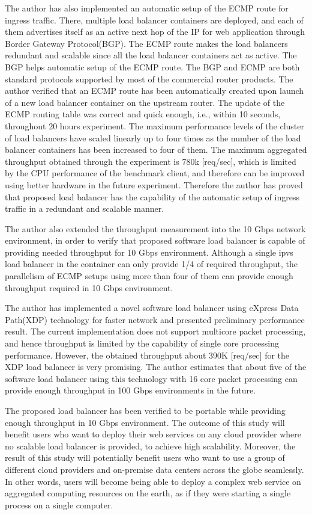 The author has also implemented an automatic setup of the ECMP route for ingress traffic.
There, multiple load balancer containers are deployed, and each of them advertises itself as an active next hop of the IP for web application through Border Gateway Protocol(BGP).
The ECMP route makes the load balancers redundant and scalable since all the load balancer containers act as active.
The BGP helps automatic setup of the ECMP route.  
The BGP and ECMP are both standard protocols supported by most of the commercial router products.
%
The author verified that an ECMP route has been automatically created upon launch of a new load balancer container on the upstream router.
The update of the ECMP routing table was correct and quick enough, i.e., within 10 seconds, throughout 20 hours experiment.
The maximum performance levels of the cluster of load balancers have scaled linearly up to four times as the number of the load balancer containers has been increased to four of them.
The maximum aggregated throughput obtained through the experiment is 780k [req/sec], which is limited by the CPU performance of the benchmark client, and therefore can be improved using better hardware in the future experiment.
Therefore the author has proved that proposed load balancer has the capability of the automatic setup of ingress traffic in a redundant and scalable manner.

The author also extended the throughput measurement into the 10 Gbps network environment, in order to verify that proposed software load balancer is capable of providing needed throughput for 10 Gbps environment.
Although a single ipvs load balancer in the container can only provide 1/4 of required throughput, the parallelism of ECMP setups using more than four of them can provide enough throughput required in 10 Gbps environment.

The author has implemented a novel software load balancer using eXpress Data Path(XDP) technology for faster network and presented preliminary performance result.
The current implementation does not support multicore packet processing, and hence throughput is limited by the capability of single core processing performance.
However, the obtained throughput about 390K [req/sec] for the XDP load balancer is very promising.
The author estimates that about five of the software load balancer using this technology with 16 core packet processing can provide enough throughput in 100  Gbps environments in the future. 

The proposed load balancer has been verified to be portable while providing enough throughput in 10 Gbps environment.
The outcome of this study will benefit users who want to deploy their web services on any cloud provider where no scalable load balancer is provided, to achieve high scalability.
Moreover, the result of this study will potentially benefit users who want to use a group of different cloud providers and on-premise data centers across the globe seamlessly.
In other words, users will become being able to deploy a complex web service on aggregated computing resources on the earth, as if they were starting a single process on a single computer.


